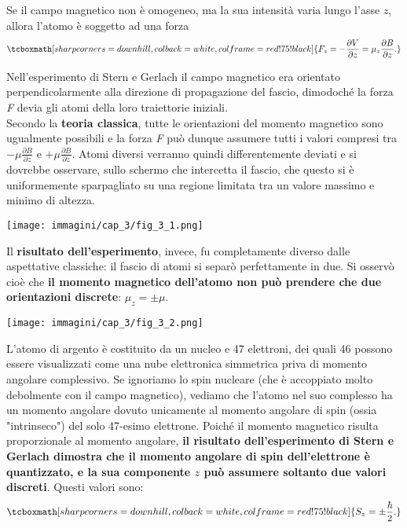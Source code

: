 \documentclass[a4paper,12pt,oneside]{book}
\begin{document}
Se il campo magnetico non è omogeneo, ma la sua intensità varia lungo l'asse $z$, allora l'atomo è soggetto ad una forza
	\begin{equation}
		\tcboxmath[sharp corners=downhill ,colback=white,colframe=red!75!black]{		
			F_z= - \frac{\partial V}{\partial z}= \mu_z\frac{\partial B}{\partial z} .
			}
\end{equation}

Nell'esperimento di Stern e Gerlach il campo magnetico era orientato perpendicolarmente alla direzione di propagazione del fascio, dimodoché la forza \emph{F} devia gli atomi della loro traiettorie iniziali.\\

Secondo la \textbf{teoria classica}, tutte le orientazioni del momento magnetico sono ugualmente possibili e la forza \emph{F} può dunque assumere tutti i valori compresi tra $-\mu \frac{\partial B}{\partial z}$ e $+\mu \frac{\partial B}{\partial z}$. Atomi diversi verranno quindi differentemente deviati e si dovrebbe osservare, sullo schermo che intercetta il fascio, che questo si è uniformemente sparpagliato su una regione limitata tra un valore massimo e minimo di altezza.
\begin{center}
\texttt{[image: immagini/cap\_3/fig\_3\_1.png]}
\end{center}
Il \textbf{risultato dell'esperimento}, invece, fu completamente diverso dalle aspettative classiche: il fascio di atomi si separò perfettamente in due. Si osservò cioè che \textbf{il momento magnetico dell'atomo non può prendere che due orientazioni discrete}: $\mu_z=\pm \mu $.\\
\begin{center}
\texttt{[image: immagini/cap\_3/fig\_3\_2.png]}
\end{center}

L'atomo di argento è costituito da un nucleo e 47 elettroni, dei quali 46 possono essere visualizzati come una nube elettronica simmetrica priva di momento angolare complessivo. Se ignoriamo lo spin nucleare (che è accoppiato molto debolmente con il campo magnetico), vediamo che l'atomo nel suo complesso ha un momento angolare dovuto unicamente al momento angolare di spin (ossia "intrinseco") del solo 47-esimo elettrone. Poiché il momento magnetico risulta proporzionale al momento angolare, \textbf{il risultato dell'esperimento di Stern e Gerlach dimostra che il momento angolare di spin dell'elettrone è quantizzato, e la sua componente $z$ può assumere soltanto due valori discreti}. Questi valori sono:
	\begin{equation}
		\tcboxmath[sharp corners=downhill ,colback=white,colframe=red!75!black]{
			S_z= \pm \frac{\hbar}{2}.
			}
	\end{equation} 
\end{document}
